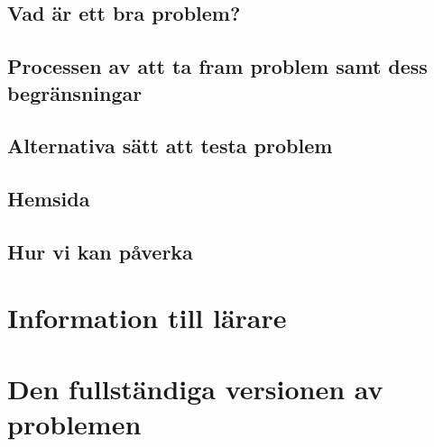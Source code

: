 \documentclass[11pt,a4paper]{article}
\begin{document}
    \subsection{Vad är ett bra problem?}
        

    \subsection{Processen av att ta fram problem samt dess begränsningar}
        
        
    \subsection{Alternativa sätt att testa problem}
        
        
    \subsection{Hemsida}
        
        
    \subsection{Hur vi kan påverka}
        


\newpage
\begin{thebibliography}{3}
    
\end{thebibliography}

\newpage
{}
\appendix

\section{Information till lärare}

\section{Den fullständiga versionen av problemen}
\end{document}
